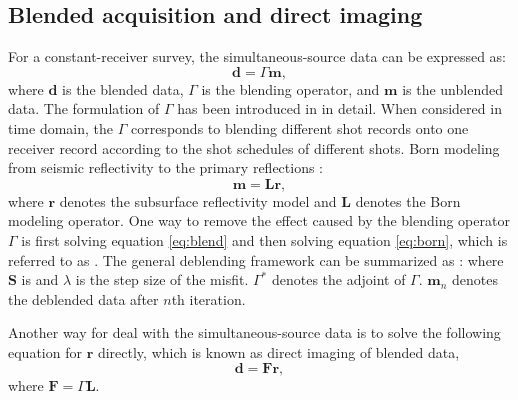 \subsection{Blended acquisition and direct imaging}
For a constant-receiver survey, the simultaneous-source data can be expressed as:
\begin{equation}
\label{eq:blend}
\mathbf{d}=\Gamma\mathbf{m},
\end{equation}
where $\mathbf{d}$ is the blended data, $\Gamma$ is the blending operator, and $\mathbf{m}$ is the unblended data. The formulation of $\Gamma$ has been introduced in \cite{arazthesis} in detail. When considered in time domain, the $\Gamma$ corresponds to blending different shot records onto one receiver record  according to the shot schedules of different shots.
 Born modeling from seismic reflectivity to the primary reflections :
\begin{equation}
\label{eq:born}
\mathbf{m}=\mathbf{L}\mathbf{r},
\end{equation}
where $\mathbf{r}$ denotes the subsurface reflectivity model and $\mathbf{L}$ denotes the Born modeling operator.
One way to remove the effect caused by the blending operator $\Gamma$ is first solving equation \ref{eq:blend} and then solving equation \ref{eq:born}, which is referred to as . The general deblending framework can be summarized as \cite[]{yangkang20142,yangkang2015pnmo}:
where $\mathbf{S}$ is   and $\lambda$ is the step size of the  misfit. $\Gamma^*$ denotes the adjoint of $\Gamma$. $\mathbf{m}_n$ denotes the deblended data after $n$th iteration.

Another way for deal with the simultaneous-source data is to solve the following equation for $\mathbf{r}$ directly, which is known as direct imaging of blended data,
\begin{equation}
\label{eq:direct}
\mathbf{d}= \mathbf{Fr}, 
\end{equation}
where $\mathbf{F}=\Gamma\mathbf{L}$.

